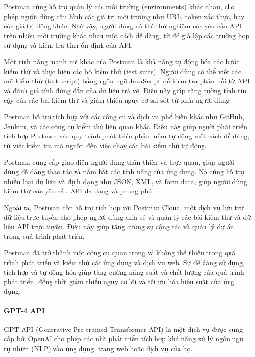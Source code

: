 Postman cũng hỗ trợ quản lý các môi trường (environments) khác nhau, cho phép người dùng cấu hình các giá trị môi trường như URL, token xác thực, hay các giá trị động khác. Nhờ vậy, người dùng có thể thử nghiệm các yêu cầu API trên nhiều môi trường khác nhau một cách dễ dàng, từ đó giả lập các trường hợp sử dụng và kiểm tra tính ổn định của API.

Một tính năng mạnh mẽ khác của Postman là khả năng tự động hóa các bước kiểm thử và thực hiện các bộ kiểm thử (test suite). Người dùng có thể viết các mã kiểm thử (test script) bằng ngôn ngữ JavaScript để kiểm tra phản hồi từ API và đánh giá tính đúng đắn của dữ liệu trả về. Điều này giúp tăng cường tính tin cậy của các bài kiểm thử và giảm thiểu nguy cơ sai sót từ phía người dùng.

Postman hỗ trợ tích hợp với các công cụ và dịch vụ phổ biến khác như GitHub, Jenkins, và các công cụ kiểm thử liên quan khác. Điều này giúp người phát triển tích hợp Postman vào quy trình phát triển phần mềm tự động một cách dễ dàng, từ việc kiểm tra mã nguồn đến việc chạy các bài kiểm thử tự động.

Postman cung cấp giao diện người dùng thân thiện và trực quan, giúp người dùng dễ dàng thao tác và nắm bắt các tính năng của ứng dụng. Nó cũng hỗ trợ nhiều loại dữ liệu và định dạng như JSON, XML, và form data, giúp người dùng kiểm thử các yêu cầu API đa dạng và phong phú.

Ngoài ra, Postman còn hỗ trợ tích hợp với Postman Cloud, một dịch vụ lưu trữ dữ liệu trực tuyến cho phép người dùng chia sẻ và quản lý các bài kiểm thử và dữ liệu API trực tuyến. Điều này giúp tăng cường sự cộng tác và quản lý dự án trong quá trình phát triển.

Postman đã trở thành một công cụ quan trọng và không thể thiếu trong quá trình phát triển và kiểm thử các ứng dụng và dịch vụ web. Sự dễ dàng sử dụng, tích hợp và tự động hóa giúp tăng cường năng suất và chất lượng của quá trình phát triển, đồng thời giảm thiểu nguy cơ lỗi và tối ưu hóa hiệu suất của ứng dụng.

\paragraph{GPT-4 API}
\mbox{}

GPT API (Generative Pre-trained Transformer API) 
là một dịch vụ được cung cấp bởi OpenAI cho phép các nhà phát triển tích hợp khả năng xử lý ngôn ngữ tự nhiên (NLP) vào ứng dụng, 
trang web hoặc dịch vụ của họ. 


